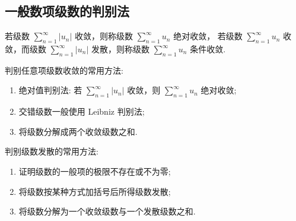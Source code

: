 \subsection{一般数项级数的判别法}

\begin{definition}[绝对收敛与条件收敛]
    若级数 $\displaystyle \sum_{n=1}^{\infty}\left|u_{n}\right| $ 收敛，则称级数 $\displaystyle \sum_{n=1}^{\infty} u_{n} $ 绝对收敛，
    若级数 $\displaystyle \sum_{n=1}^{\infty} u_{n} $ 收敛，而级数 $\displaystyle  \sum_{n=1}^{\infty}\left|u_{n}\right| $ 发散，则称级数 $\displaystyle \sum_{n=1}^{\infty} u_{n} $ 条件收敛.
\end{definition}

判别任意项级数收敛的常用方法:
\begin{enumerate}[label=(\arabic{*})]
    \item 绝对值判别法: 若 $\displaystyle  \sum_{n=1}^{\infty}\left|u_{n}\right| $ 收敛，则 $\displaystyle  \sum_{n=1}^{\infty} u_{n} $ 绝对收敛;
    \item 交错级数一般使用 Leibniz 判别法;
    \item 将级数分解成两个收敛级数之和.
\end{enumerate}

判别级数发散的常用方法:
\begin{enumerate}[label=(\arabic{*})]
    \item 证明级数的一般项的极限不存在或不为零;
    \item 将级数按某种方式加括号后所得级数发散;
    \item 将级数分解为一个收敛级数与一个发散级数之和.
\end{enumerate}

